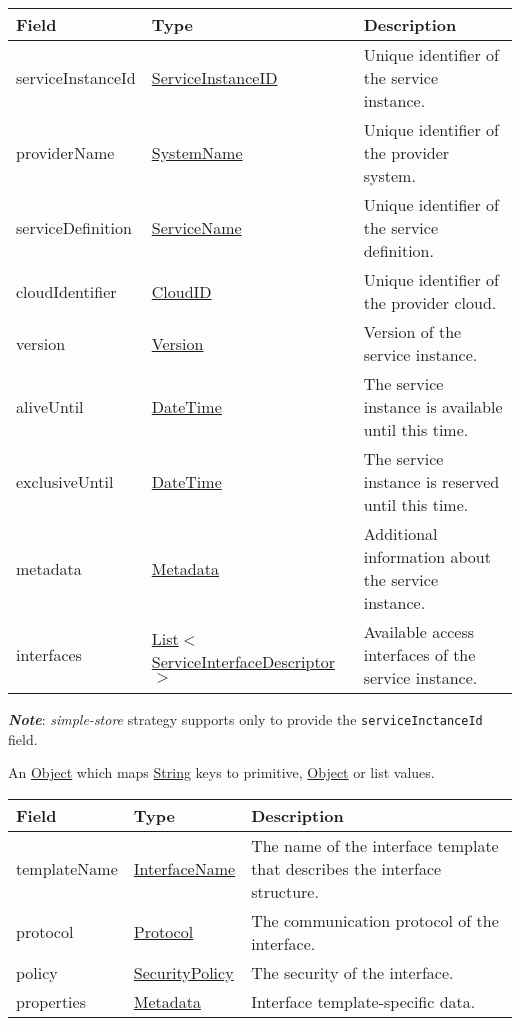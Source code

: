 \documentclass[a4paper]{arrowhead}
\newcommand{\pref}[1]{{\textcolor{ArrowheadGrey}{\hyperref[sec:model:primitives:#1]{#1}}}}
\begin{document}

\begin{table}[ht!]
\begin{tabularx}{\textwidth}{| p{3cm} | p{5.1cm} | X |} \hline
\rowcolor{gray!33} Field & Type & Description \\ \hline
serviceInstanceId & \pref{ServiceInstanceID} & Unique identifier of the service instance. \\ \hline
providerName & \pref{SystemName} & Unique identifier of the provider system. \\ \hline
serviceDefinition & \pref{ServiceName} & Unique identifier of the service definition. \\ \hline
cloudIdentifier & \pref{CloudID} & Unique identifier of the provider cloud. \\ \hline
version & \pref{Version} & Version of the service instance. \\ \hline
aliveUntil & \pref{DateTime} & The service instance is available until this time. \\ \hline
exclusiveUntil & \pref{DateTime} & The service instance is reserved until this time. \\ \hline
metadata & \hyperref[sec:model:Metadata]{Metadata} & Additional information about the service instance. \\ \hline
interfaces & \pref{List}$<$\hyperref[sec:model:ServiceInterfaceDescriptor]{ServiceInterfaceDescriptor}$>$ & Available access interfaces of the service instance. \\ \hline
\end{tabularx}
\end{table}

\textbf{\textit{Note}}: \textit{simple-store} strategy supports only to provide the \texttt{serviceInctanceId} field. 


An \pref{Object} which maps \pref{String} keys to primitive, \pref{Object} or list values.

\clearpage

 
\begin{table}[ht!]
\begin{tabularx}{\textwidth}{| p{2.5cm} | p{3cm} | X |} \hline
\rowcolor{gray!33} Field & Type & Description \\ \hline
templateName & \pref{InterfaceName} & The name of the interface template that describes the interface structure. \\ \hline
protocol & \pref{Protocol} & The communication protocol of the interface. \\ \hline
policy & \pref{SecurityPolicy} & The security of the interface. \\ \hline
properties &\hyperref[sec:model:Metadata]{Metadata} & Interface template-specific data. \\ \hline
\end{tabularx}
\end{table}
\end{document}
